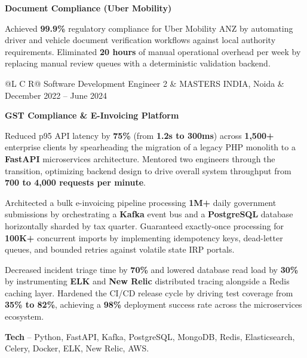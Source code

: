 \textcolor{Project}{\textbf{Document Compliance (Uber Mobility)}}
\vspace{-0.8ex}
\begin{zitemize}
    \item Achieved \textbf{99.9\%} regulatory compliance for Uber Mobility ANZ by automating driver and vehicle document verification workflows against local authority requirements. Eliminated \textbf{20 hours} of manual operational overhead per week by replacing manual review queues with a deterministic validation backend.
\end{zitemize}

\noindent
\begin{tabularx}{\textwidth}{@{}L C R@{}}
\textcolor{role}{Software Development Engineer 2} & \textcolor{company}{MASTERS INDIA, Noida} & \textcolor{date}{December 2022 -- June 2024}\\
\end{tabularx}
\vspace{-1.6ex}

\textcolor{Project}{\textbf{GST Compliance \& E-Invoicing Platform}}
\vspace{-0.8ex}
\begin{zitemize}
    \item Reduced p95 API latency by \textbf{75\%} (from \textbf{1.2s to 300ms}) across \textbf{1,500+} enterprise clients by spearheading the migration of a legacy PHP monolith to a \textbf{FastAPI} microservices architecture. Mentored two engineers through the transition, optimizing backend design to drive overall system throughput from \textbf{700 to 4,000 requests per minute}.
    \item Architected a bulk e-invoicing pipeline processing \textbf{1M+} daily government submissions by orchestrating a \textbf{Kafka} event bus and a \textbf{PostgreSQL} database horizontally sharded by tax quarter. Guaranteed exactly-once processing for \textbf{100K+} concurrent imports by implementing idempotency keys, dead-letter queues, and bounded retries against volatile state IRP portals.
    \item Decreased incident triage time by \textbf{70\%} and lowered database read load by \textbf{30\%} by instrumenting \textbf{ELK} and \textbf{New Relic} distributed tracing alongside a Redis caching layer. Hardened the CI/CD release cycle by driving test coverage from \textbf{35\% to 82\%}, achieving a \textbf{98\%} deployment success rate across the microservices ecosystem.
    \item \textbf{Tech} -- Python, FastAPI, Kafka, PostgreSQL, MongoDB, Redis, Elasticsearch, Celery, Docker, ELK, New Relic, AWS.
\end{zitemize}

